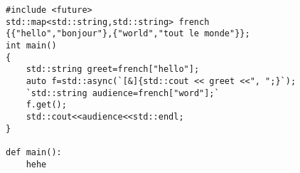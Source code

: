 \begin{lstlisting}[label=samplecode,caption=A sample]
#include <future>
std::map<std::string,std::string> french
{{"hello","bonjour"},{"world","tout le monde"}};
int main()
{
	std::string greet=french["hello"];
	auto f=std::async(`[&]{std::cout << greet <<", ";}`);
	`std::string audience=french["word"];`
	f.get();
	std::cout<<audience<<std::endl;
}

def main():
	hehe
\end{lstlisting}


